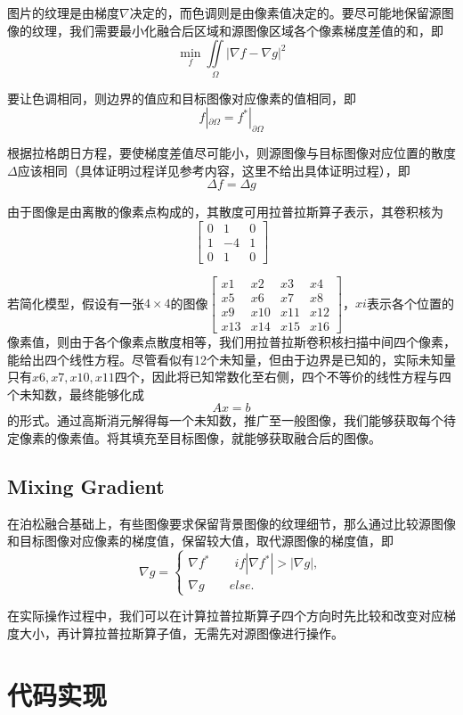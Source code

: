 \documentclass[12pt, a4paper, oneside]{report}
\begin{document}
	图片的纹理是由梯度$\nabla$决定的，而色调则是由像素值决定的。要尽可能地保留源图像的纹理，我们需要最小化融合后区域和源图像区域各个像素梯度差值的和，即$$\min\limits_{f}^{}\iint\limits_{\Omega}\left|\nabla f - \nabla g\right|^2$$
	
	要让色调相同，则边界的值应和目标图像对应像素的值相同，即$$f|_{\partial\Omega} = f^*|_{\partial\Omega}$$
	
	根据拉格朗日方程，要使梯度差值尽可能小，则源图像与目标图像对应位置的散度$\Delta$应该相同（具体证明过程详见参考内容，这里不给出具体证明过程），即$$\Delta f = \Delta g$$
	
	由于图像是由离散的像素点构成的，其散度可用拉普拉斯算子表示，其卷积核为$$\left[\begin{array}{ccc}
		0 & 1 & 0\\
		1 & -4 & 1\\
		0 & 1 & 0
	\end{array} 
	\right]$$
	
	若简化模型，假设有一张$4\times4$的图像$\left[\begin{array}{cccc}
		x1 & x2 & x3 & x4\\
		x5 & x6 & x7 & x8\\
		x9 & x10 & x11 & x12\\
		x13 & x14 & x15 & x16
	\end{array}\right]$，$xi$表示各个位置的像素值，则由于各个像素点散度相等，我们用拉普拉斯卷积核扫描中间四个像素，能给出四个线性方程。尽管看似有12个未知量，但由于边界是已知的，实际未知量只有$x6, x7, x10, x11$四个，因此将已知常数化至右侧，四个不等价的线性方程与四个未知数，最终能够化成$$Ax=b$$的形式。通过高斯消元解得每一个未知数，推广至一般图像，我们能够获取每个待定像素的像素值。将其填充至目标图像，就能够获取融合后的图像。
	\subsection{Mixing Gradient}
	在泊松融合基础上，有些图像要求保留背景图像的纹理细节，那么通过比较源图像和目标图像对应像素的梯度值，保留较大值，取代源图像的梯度值，即
	$$\nabla g = \begin{cases}
	\nabla f^*  \qquad if |\nabla f^*| > |\nabla g|, \\
	\nabla g \qquad else.	\end{cases}$$

	在实际操作过程中，我们可以在计算拉普拉斯算子四个方向时先比较和改变对应梯度大小，再计算拉普拉斯算子值，无需先对源图像进行操作。
	\section{代码实现}
\end{document}
